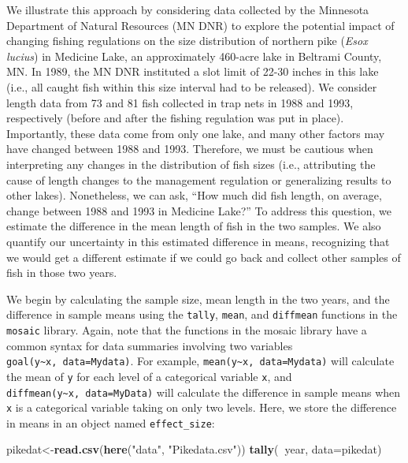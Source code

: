 \documentclass[fleqn,10pt]{wlpeerj} %
\newenvironment{Shaded}{\begin{snugshade}}{\end{snugshade}}
\newcommand{\DataTypeTok}[1]{\textcolor[rgb]{0.13,0.29,0.53}{#1}}
\newcommand{\KeywordTok}[1]{\textcolor[rgb]{0.13,0.29,0.53}{\textbf{#1}}}
\newcommand{\NormalTok}[1]{#1}
\newcommand{\OperatorTok}[1]{\textcolor[rgb]{0.81,0.36,0.00}{\textbf{#1}}}
\newcommand{\StringTok}[1]{\textcolor[rgb]{0.31,0.60,0.02}{#1}}
\begin{document}
We illustrate this approach by considering data collected by the Minnesota Department of Natural Resources (MN DNR) to explore the potential impact of changing fishing regulations on the size distribution of northern pike (\emph{Esox lucius}) in Medicine Lake, an approximately 460-acre lake in Beltrami County, MN. In 1989, the MN DNR instituted a slot limit of 22-30 inches in this lake (i.e., all caught fish within this size interval had to be released). We consider length data from 73 and 81 fish collected in trap nets in 1988 and 1993, respectively (before and after the fishing regulation was put in place). Importantly, these data come from only one lake, and many other factors may have changed between 1988 and 1993. Therefore, we must be cautious when interpreting any changes in the distribution of fish sizes (i.e., attributing the cause of length changes to the management regulation or generalizing results to other lakes). Nonetheless, we can ask, ``How much did fish length, on average, change between 1988 and 1993 in Medicine Lake?'' To address this question, we estimate the difference in the mean length of fish in the two samples. We also quantify our uncertainty in this estimated difference in means, recognizing that we would get a different estimate if we could go back and collect other samples of fish in those two years.

We begin by calculating the sample size, mean length in the two years, and the difference in sample means using the \texttt{tally}, \texttt{mean}, and \texttt{diffmean} functions in the \texttt{mosaic} library. Again, note that the functions in the mosaic library have a common syntax for data summaries involving two variables \texttt{goal(y\textasciitilde{}x,\ data=Mydata)}. For example, \texttt{mean(y\textasciitilde{}x,\ data=Mydata)} will calculate the mean of \texttt{y} for each level of a categorical variable \texttt{x}, and \texttt{diffmean(y\textasciitilde{}x,\ data=MyData)} will calculate the difference in sample means when \texttt{x} is a categorical variable taking on only two levels. Here, we store the difference in means in an object named \texttt{effect\_size}:

\begin{Shaded}
\begin{Highlighting}[]
\NormalTok{pikedat<-}\KeywordTok{read.csv}\NormalTok{(}\KeywordTok{here}\NormalTok{(}\StringTok{"data"}\NormalTok{, }\StringTok{"Pikedata.csv"}\NormalTok{))}
\KeywordTok{tally}\NormalTok{(}\OperatorTok{~}\NormalTok{year, }\DataTypeTok{data=}\NormalTok{pikedat)}
\end{Highlighting}
\end{Shaded}
\end{document}
